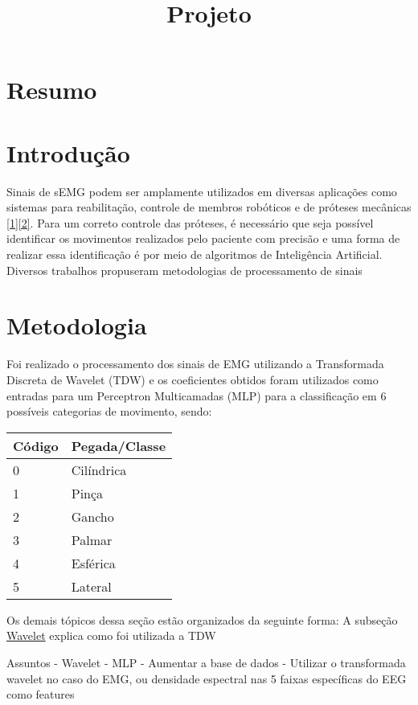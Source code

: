 \documentclass[11pt]{article}
\title{Projeto}
\begin{document}
    
    \maketitle
    
    

    
    \hypertarget{resumo}{%
\section{Resumo}\label{resumo}}

    

    \hypertarget{introduuxe7uxe3o}{%
\section{Introdução}\label{introduuxe7uxe3o}}

    Sinais de sEMG podem ser amplamente utilizados em diversas aplicações
como sistemas para reabilitação, controle de membros robóticos e de
próteses mecânicas \hyperref[1]{[1]}\hyperref[2]{[2]}. Para um correto
controle das próteses, é necessário que seja possível identificar os
movimentos realizados pelo paciente com precisão e uma forma de realizar
essa identificação é por meio de algoritmos de Inteligência Artificial.
Diversos trabalhos propuseram metodologias de processamento de sinais

    \hypertarget{metodologia}{%
\section{Metodologia}\label{metodologia}}

    Foi realizado o processamento dos sinais de EMG utilizando a
Transformada Discreta de Wavelet (TDW) e os coeficientes obtidos foram
utilizados como entradas para um Perceptron Multicamadas (MLP) para a
classificação em 6 possíveis categorias de movimento, sendo:

\begin{longtable}[]{@{}ll@{}}
\toprule
Código & Pegada/Classe\tabularnewline
\midrule
\endhead
0 & Cilíndrica\tabularnewline
1 & Pinça\tabularnewline
2 & Gancho\tabularnewline
3 & Palmar\tabularnewline
4 & Esférica\tabularnewline
5 & Lateral\tabularnewline
\bottomrule
\end{longtable}

Os demais tópicos dessa seção estão organizados da seguinte forma: A
subseção \hyperref[wavelet]{Wavelet} explica como foi utilizada a TDW

Assuntos - Wavelet - MLP - Aumentar a base de dados - Utilizar o
transformada wavelet no caso do EMG, ou densidade espectral nas 5 faixas
específicas do EEG como features
\end{document}
